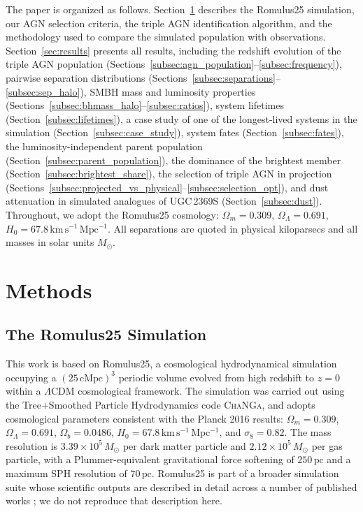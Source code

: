 \documentclass[twocolumn, 10pt]{article}
\newcommand{\todo}[1]{\textcolor{red}{\textbf{[TODO: #1]}}}
\begin{document}
The paper is organized as follows. Section~\ref{sec:methods} describes the Romulus25 simulation, our AGN selection criteria, the triple AGN identification algorithm, and the methodology used to compare the simulated population with observations. Section~\ref{sec:results} presents all results, including the redshift evolution of the triple AGN population (Sections~\ref{subsec:agn_population}--\ref{subsec:frequency}), pairwise separation distributions (Sections~\ref{subsec:separations}--\ref{subsec:sep_halo}), SMBH mass and luminosity properties (Sections~\ref{subsec:bhmass_halo}--\ref{subsec:ratios}), system lifetimes (Section~\ref{subsec:lifetimes}), a case study of one of the longest-lived systems in the simulation (Section~\ref{subsec:case_study}), system fates (Section~\ref{subsec:fates}), the luminosity-independent parent population (Section~\ref{subsec:parent_population}), the dominance of the brightest member (Section~\ref{subsec:brightest_share}), the selection of triple AGN in projection (Sections~\ref{subsec:projected_vs_physical}--\ref{subsec:selection_opt}), and dust attenuation in simulated analogues of UGC\,2369S (Section~\ref{subsec:dust}). Throughout, we adopt the Romulus25 cosmology: $\Omega_m = 0.309$, $\Omega_\Lambda = 0.691$, $H_0 = 67.8\,\mathrm{km\,s^{-1}\,Mpc^{-1}}$. All separations are quoted in physical kiloparsecs and all masses in solar units $M_\odot$.



\newpage
\section{Methods}
\label{sec:methods}

\subsection{The Romulus25 Simulation}
\label{subsec:romulus}

This work is based on Romulus25, a cosmological hydrodynamical simulation occupying a $(25\,\mathrm{cMpc})^3$ periodic volume evolved from high redshift to $z = 0$ within a $\Lambda$CDM cosmological framework. The simulation was carried out using the Tree+Smoothed Particle Hydrodynamics code \textsc{ChaNGa}, and adopts cosmological parameters consistent with the Planck 2016 results: $\Omega_m = 0.309$, $\Omega_\Lambda = 0.691$, $\Omega_b = 0.0486$, $H_0 = 67.8\,\mathrm{km\,s^{-1}\,Mpc^{-1}}$, and $\sigma_8 = 0.82$. The mass resolution is $3.39 \times 10^5\,M_\odot$ per dark matter particle and $2.12 \times 10^5\,M_\odot$ per gas particle, with a Plummer-equivalent gravitational force softening of $250\,\mathrm{pc}$ and a maximum SPH resolution of $70\,\mathrm{pc}$. Romulus25 is part of a broader simulation suite whose scientific outputs are described in detail across a number of published works \citep{Tremmel2015, Tremmel2017, Tremmel2019, Tremmel2020, Chadayammuri2020}; we do not reproduce that description here.
\end{document}

